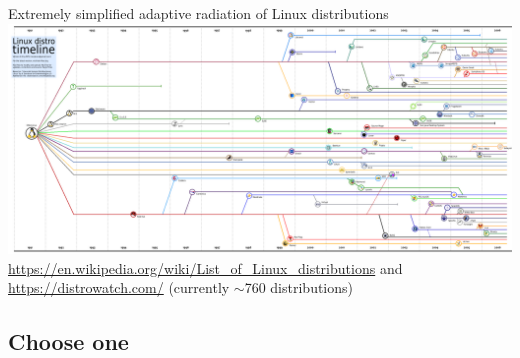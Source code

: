\documentclass[compress, ucs, xelatex, 11pt, xcolor=svgnames,
  hyperref={
    bookmarks=true,
    unicode=true,
    colorlinks=true,
    pdftitle={Linux, command line and MetaCentrum},
    plainpages=false,
    pdfauthor={Vojtech Zeisek},
    pdfsubject={Course about use of Linux command line, writing shell scripts and using MetaCentrum of CESNET},
    pdfcreator={XeLaTeX},
    pdfkeywords={Linux, GNU, BASH, shell, command line, MetaCentrum},
    linkcolor=Red,
    anchorcolor=Blue,
    citecolor=Purple,
    filecolor=DodgerBlue,
    menucolor=DarkOrchid,
    urlcolor=DeepSkyBlue,
    pdftex},
  url={hyphens, lowtilde} %
  ]{beamer}
\begin{document}
\begin{frame}{Extremely simplified adaptive radiation of Linux distributions}
  \includegraphics[width=\textwidth]{linux_fylogen_2.png}\\
  \url{https://en.wikipedia.org/wiki/List_of_Linux_distributions} and \url{https://distrowatch.com/} (currently $\sim$760 distributions)
\end{frame}

\subsection{Choose one}
\end{document}
